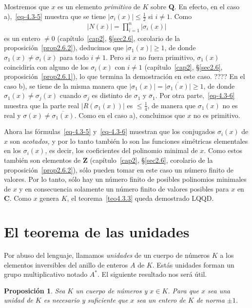 \documentclass[bibtotoc,leqno,spanish]{amsbook}
\newcommand{\QQ}{\mathbf{Q}}
\newcommand{\ZZ}{\mathbf{Z}}
\newcommand{\CC}{\mathbf{C}}
\newcommand{\QED}{LQQD.}
\newcommand{\oline}[1]{\overline{#1}}
\newcommand{\abs}[1]{\left\lvert#1\right\rvert}
\numberwithin{equation}{section}
\theoremstyle{note}
\theoremstyle{note}
\newtheorem{proposition}{Proposici\'on}
\theoremstyle{rem}
\numberwithin{theorem}{section}
\numberwithin{proposition}{section}
\numberwithin{definition}{section}
\numberwithin{lemma}{section}
\numberwithin{corollary}{section}
\numberwithin{example}{section}
\numberwithin{footnote}{section}%
\begin{document}
Mostremos que $x$ es un elemento {\em primitivo} de $K$ sobre $\QQ$. En efecto, en el caso a),~\eqref{eq-4.3-5}
muestra que se tiene $\abs{\sigma_{i}(x)}\leq\frac{1}{2}$ si $i\neq 1$. Como
\begin{gather*}
\abs{N(x)} = \prod_{i=1}^{n}\abs{\sigma_{i}(x)}
\end{gather*}
es un entero $\neq 0$ (cap\'itulo~\ref{cap2}, \S\ref{sec2.6}, corolario de la proposici\'on~\ref{prop2.6.2}),
deducimos que $\abs{\sigma_{1}(x)}\geq 1$,
de donde $\sigma_{1}(x)\neq\sigma_{i}(x)$ para todo $i\neq 1$. Pero si $x$ no fuera primitivo,
$\sigma_{1}(x)$ coincidir\'ia con alguno de los $\sigma_{i}(x)$ con $i\neq 1$
(cap\'itulo~\ref{cap2}, \S\ref{sec2.6}, proposici\'on~\ref{prop2.6.1}),
lo que termina la demostraci\'on en este caso. ???? En el caso b), se tiene de la misma manera que
$\abs{\sigma_{1}(x)}=\oline{\abs{\sigma_{1}(x)}}\geq 1$, de donde $\sigma_{1}(x)\neq\sigma_{j}(x)$
cuando $\sigma_{j}$ es distinto de $\sigma_{1}$ y $\oline\sigma_{1}$. Por otra parte,~\eqref{eq-4.3-6}
muestra que la parte real $\abs{R(\sigma_{1}(x))}$ es $\leq\frac{1}{4}$, de manera que $\sigma_{1}(x)$
no es real y $\sigma(x)\neq\oline{\sigma_{1}(x)}$. Como en el caso a), concluimos que $x$ no es primitivo.

Ahora las f\'ormulas~\eqref{eq-4.3-5} y~\eqref{eq-4.3-6} muestran que los conjugados $\sigma_{i}(x)$ de $x$ son
{\em acotados,} y por lo tanto tambi\'en lo son las funciones sim\'etricas elementales en los $\sigma_{i}(x)$,
es decir, los coeficientes del polinomio minimal de $x$. Como estos tambi\'en son elementos de $\ZZ$
(cap\'itulo~\ref{cap2}, \S\ref{sec2.6}, corolario de la proposici\'on~\ref{prop2.6.2}),
s\'olo pueden tomar en este caso un n\'umero finito de valores.
Por lo tanto, s\'olo hay un n\'umero finito de posibles polinomios minimales de $x$ y en consecuencia
solamente un n\'umero finito de valores posibles para $x$ en $\CC$. Como $x$ genera $K$, el teorema~\ref{teo4.3.3} queda
demostrado LQQD.%

\section{El teorema de las unidades}\label{sec4.4}

Por abuso del lenguaje, llamamos {\em unidades} de un cuerpo de n\'umeros $K$ a los elementos inversibles
del anillo de enteros $A$ de $K$. Est\'as unidades forman un grupo multiplicativo notado $A^{*}$. El
siguiente resultado nos ser\'a \'util.

\begin{proposition}\label{prop4.4.1}
Sea $K$ un cuerpo de n\'umeros y $x\in K$. Para que $x$ sea una unidad de $K$ es
necesario y suficiente que $x$ sea un entero de $K$ de norma $\pm 1$.
\end{proposition}
\end{document}
